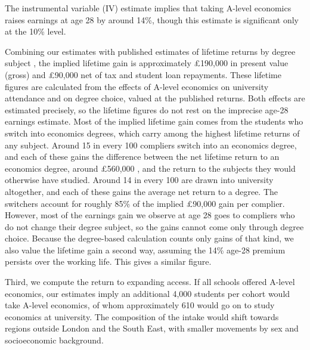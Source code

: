 The instrumental variable (IV) estimate implies that taking A-level economics raises earnings at age 28 by around 14\%, though this estimate is significant only at the 10\% level.

Combining our estimates with published estimates of lifetime returns by degree subject \citep{britton2026lifetime}, the implied lifetime gain is approximately \pounds 190,000 in present value (gross) and \pounds 90,000 net of tax and student loan repayments. These lifetime figures are calculated from the effects of A-level economics on university attendance and on degree choice, valued at the published returns. Both effects are estimated precisely, so the lifetime figures do not rest on the imprecise age-28 earnings estimate.
Most of the implied lifetime gain comes from the students who switch into economics degrees, which carry among the highest lifetime returns of any subject. Around 15 in every 100 compliers switch into an economics degree, and each of these gains the difference between the net lifetime return to an economics degree, around \pounds 560,000 \citep{britton2026lifetime}, and the return to the subjects they would otherwise have studied. Around 14 in every 100 are drawn into university altogether, and each of these gains the average net return to a degree. The switchers account for roughly 85\% of the implied \pounds 90,000 gain per complier. However, most of the earnings gain we observe at age 28 goes to compliers who do not change their degree subject, so the gains cannot come only through degree choice. Because the degree-based calculation counts only gains of that kind, we also value the lifetime gain a second way, assuming the 14\% age-28 premium persists over the working life. This gives a similar figure.

Third, we compute the return to expanding access. If all schools offered A-level economics, our estimates imply an additional 4,000 students per cohort would take A-level economics, of whom approximately 610 would go on to study economics at university. The composition of the intake would shift towards regions outside London and the South East, with smaller movements by sex and socioeconomic background.


